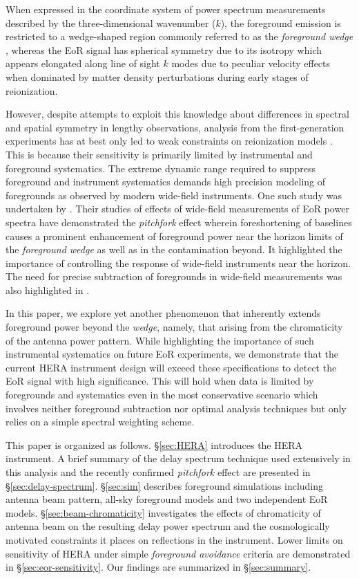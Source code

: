 \documentclass[preprint2,iop,numberedappendix,twocolappendix,appendixfloats]{emulateapj}
\begin{document}
When expressed in the coordinate system of power spectrum measurements described by the three-dimensional wavenumber ($k$), the foreground emission is restricted to a wedge-shaped region commonly referred to as the {\it foreground wedge} \citep{bow09,liu09,liu14a,liu14b,dat10,liu11,gho12,mor12,par12b,tro12,ved12,dil13,pob13,thy13,dil14}, whereas the EoR signal has spherical symmetry due to its isotropy which appears elongated along line of sight $k$ modes due to peculiar velocity effects when dominated by matter density perturbations during early stages of reionization. 

However, despite attempts to exploit this knowledge about differences in spectral and spatial symmetry in lengthy observations, analysis from the first-generation experiments has at best only led to weak constraints on reionization models \citep{ali15,dil15,pob15}. This is because their sensitivity is primarily limited by instrumental and foreground systematics. The extreme dynamic range required to suppress foreground and instrument systematics demands high precision modeling of foregrounds as observed by modern wide-field instruments. One such study was undertaken by \citet{thy15a,thy15b}. Their studies of effects of wide-field measurements of EoR power spectra have demonstrated the {\it pitchfork} effect wherein foreshortening of baselines causes a prominent enhancement of foreground power near the horizon limits of the {\it foreground wedge} as well as in the contamination beyond. It highlighted the importance of controlling the response of wide-field instruments near the horizon. The need for precise subtraction of foregrounds in wide-field measurements was also highlighted in \citet{pob16}.

In this paper, we explore yet another phenomenon that inherently extends foreground power beyond the {\it wedge}, namely, that arising from the chromaticity of the antenna power pattern. While highlighting the importance of such instrumental systematics on future EoR experiments, we demonstrate that the current HERA instrument design will exceed these specifications to detect the EoR signal with high significance. This will hold when data is limited by foregrounds and systematics even in the most conservative scenario which involves neither foreground subtraction nor optimal analysis techniques but only relies on a simple spectral weighting scheme. 

This paper is organized as follows. \S\ref{sec:HERA} introduces the HERA instrument. A brief summary of the delay spectrum technique used extensively in this analysis and the recently confirmed {\it pitchfork} effect are presented in \S\ref{sec:delay-spectrum}. \S\ref{sec:sim} describes foreground simulations including antenna beam pattern, all-sky foreground models and two independent EoR models. \S\ref{sec:beam-chromaticity} investigates the effects of chromaticity of antenna beam on the resulting delay power spectrum and the cosmologically motivated constraints it places on reflections in the instrument. Lower limits on sensitivity of HERA under simple {\it foreground avoidance} criteria are demonstrated in \S\ref{sec:eor-sensitivity}. Our findings are summarized in \S\ref{sec:summary}.
\end{document}
